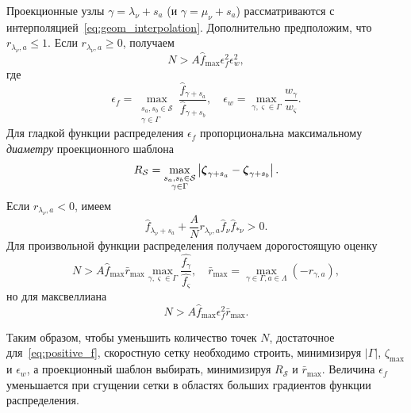 Проекционные узлы \(\gamma = \lambda_\nu+s_a\) (и \(\gamma = \mu_\nu+s_a\))
рассматриваются с интерполяцией~\eqref{eq:geom_interpolation}.
Дополнительно предположим, что \(r_{\lambda_\nu,a} \leq 1\).
Если \(r_{\lambda_\nu,a} \geq 0\), получаем
\begin{equation}\label{eq:positive_f_lambda2+}
    N > A \hat{f}_{\max} \epsilon_f^2 \epsilon_w^2,
\end{equation}
где
\begin{equation}\label{eq:epsilon_f}
    \epsilon_f = \max_{\substack{s_a,s_b\in\mathcal{S}\\\gamma\in\Gamma}} \frac{\hat{f}_{\gamma+s_a}}{\hat{f}_{\gamma+s_b}}, \quad
    \epsilon_w = \max_{\gamma,\varsigma\in\Gamma} \frac{w_\gamma}{w_\varsigma}.
\end{equation}
Для гладкой функции распределения \(\epsilon_f\) пропорциональна максимальному \emph{диаметру} проекционного шаблона
\begin{equation}\label{eq:stencil_diameter}
    R_\mathcal{S} = \max_{\substack{s_a,s_b\in\mathcal{S}\\\gamma\in\Gamma}}
        \left| {\boldsymbol{\zeta}}_{\gamma+s_a} - {\boldsymbol{\zeta}}_{\gamma+s_b} \right|.
\end{equation}
Если \(r_{\lambda_\nu,a} < 0\), имеем
\begin{equation}\label{eq:positive_f_lambda-}
    \hat{f}_{\lambda_\nu+s_a} + \frac{A}{N}r_{\lambda_\nu,a} \hat{f}_{\nu}\hat{f}_{*\nu} > 0.
\end{equation}
Для произвольной функции распределения получаем дорогостоящую оценку
\begin{equation}\label{eq:positive_f_lambda2-}
    N > A \hat{f}_{\max} \bar{r}_{\max} \max_{\gamma,\varsigma\in\Gamma}\frac{\hat{f_\gamma}}{\hat{f_\varsigma}}, \quad
    \bar{r}_{\max} = \max_{\gamma\in\Gamma,a\in\Lambda}( -r_{\gamma,a} ),
\end{equation}
но для максвеллиана
\begin{equation}\label{eq:positive_f_lambda2-maxw}
    N > A \hat{f}_{\max} \epsilon_f^2 \bar{r}_{\max}.
\end{equation}

Таким образом, чтобы уменьшить количество точек \(N\), достаточное для~\eqref{eq:positive_f},
скоростную сетку необходимо строить, минимизируя \(|\Gamma|\), \(\zeta_{\max}\) и \(\epsilon_w\),
а проекционный шаблон выбирать, минимизируя \(R_\mathcal{S}\) и \(\bar{r}_{\max}\).
Величина \(\epsilon_f\) уменьшается при сгущении сетки в областях больших градиентов функции распределения.

